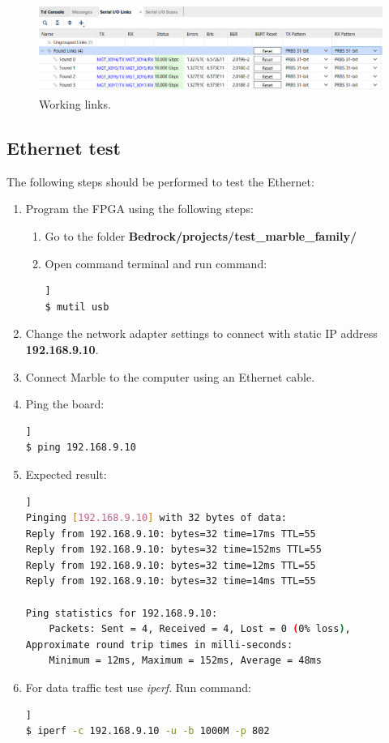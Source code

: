 \documentclass[12pt,oneside,a4]{article}
\begin{document}
\begin{figure}[H]
\begin{center}
\includegraphics[width=1\linewidth]{links.png}
 \caption{Working links.}\label{links}
\end{center}
\end{figure}

\subsection{Ethernet test}
The following steps should be performed to test the Ethernet:
\begin{enumerate}
    \item Program the FPGA using the following steps:
	\begin{enumerate}
	\item Go to the folder \textbf{Bedrock/projects/test\_marble\_family/}
	\item Open command terminal and run command:
	\begin{lstlisting}[backgroundcolor = \color{Gainsboro}, language=bash, frame=none]]
$ mutil usb
	\end{lstlisting}
	\end{enumerate}
    \item Change the network adapter settings to connect with static IP address \textbf{192.168.9.10}.
    \item Connect Marble to the computer using an Ethernet cable.
    \item Ping the board:
    \begin{lstlisting}[backgroundcolor = \color{Gainsboro}, language=bash, frame=none]]
$ ping 192.168.9.10
	\end{lstlisting}
    \item Expected result:
    \begin{lstlisting}[backgroundcolor = \color{Gainsboro}, language=bash, frame=none]]
Pinging [192.168.9.10] with 32 bytes of data:
Reply from 192.168.9.10: bytes=32 time=17ms TTL=55
Reply from 192.168.9.10: bytes=32 time=152ms TTL=55
Reply from 192.168.9.10: bytes=32 time=12ms TTL=55
Reply from 192.168.9.10: bytes=32 time=14ms TTL=55

Ping statistics for 192.168.9.10:
    Packets: Sent = 4, Received = 4, Lost = 0 (0% loss),
Approximate round trip times in milli-seconds:
    Minimum = 12ms, Maximum = 152ms, Average = 48ms
	\end{lstlisting}
    \item For data traffic test use \textit{iperf}. Run command:
    \begin{lstlisting}[backgroundcolor = \color{Gainsboro}, language=bash, frame=none]]
$ iperf -c 192.168.9.10 -u -b 1000M -p 802
	\end{lstlisting}
\end{enumerate}
\end{document}
